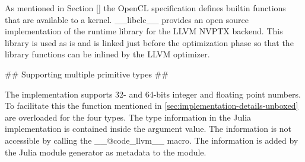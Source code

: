 \begin{markdown}
As mentioned in Section \ref{} the OpenCL specification defines
builtin functions that are available to a kernel. __libclc__
\cite{libclc} provides an open source implementation of the runtime
library for the LLVM NVPTX backend. This library is used as is and is
linked just before the optimization phase so that the library functions
can be inlined by the LLVM optimizer.

## Supporting multiple primitive types ##

The implementation supports 32- and 64-bits integer and floating point
numbers. To facilitate this the function mentioned in
\ref{sec:implementation-details-unboxed} are overloaded for the four
types. The type information in the Julia implementation is contained
inside the argument value. The information is not accessible by
calling the __@code_llvm__ macro. The information is added by the
Julia module generator as metadata to the module. 

\end{markdown}
